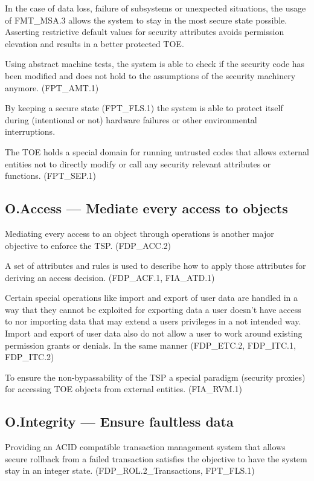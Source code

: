 \documentclass[12pt,english]{scrbook}
\begin{document}
    In the case of data loss, failure of subsystems or unexpected situations,
    the usage of FMT\_MSA.3 allows the system to stay in the most secure state
    possible. Asserting restrictive default values for security attributes
    avoids permission elevation and results in a better protected TOE.
    
    Using abstract machine tests, the system is able to check if the security
    code has been modified and does not hold to the assumptions of the security
    machinery anymore. (FPT\_AMT.1)

    By keeping a secure state (FPT\_FLS.1) the system is able to protect itself
    during (intentional or not) hardware failures or other environmental
    interruptions.
    
    The TOE holds a special domain for running untrusted codes that allows
    external entities not to directly modify or call any security relevant
    attributes or functions. (FPT\_SEP.1)

\subsection{O.Access --- Mediate every access to objects}

    Mediating every access to an object through operations is another major
    objective to enforce the TSP. (FDP\_ACC.2)

    A set of attributes and rules is used to describe how to apply those
    attributes for deriving an access decision. (FDP\_ACF.1, FIA\_ATD.1)  

    Certain special operations like import and export of user data are handled
    in a way that they cannot be exploited for exporting data a user doesn't
    have access to nor importing data that may extend a users privileges in a
    not intended way. Import and export of user data also do not allow a user
    to work around existing permission grants or denials. In the same manner (FDP\_ETC.2,
    FDP\_ITC.1, FDP\_ITC.2)

    To ensure the non-bypassability of the TSP a special paradigm (security
    proxies) for accessing TOE objects from external entities. (FIA\_RVM.1)
    
\subsection{O.Integrity --- Ensure faultless data}

    Providing an ACID compatible transaction management system that allows
    secure rollback from a failed transaction satisfies the objective to have
    the system stay in an integer state. (FDP\_ROL.2\_Transactions, FPT\_FLS.1)
\end{document}
